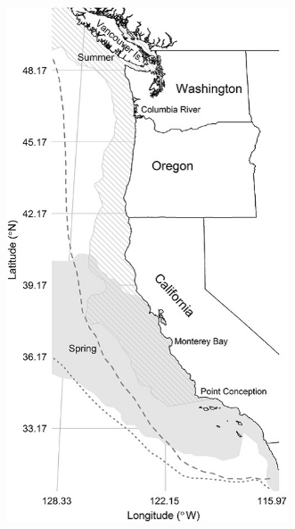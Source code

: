 \documentclass[
  letterpaper,
  oneside,
  open=any]{scrbook}
\begin{document}
\begin{figure}

\begin{minipage}{0.50\linewidth}

\begin{figure}[H]

{\centering \includegraphics[width=\textwidth,height=6in]{content/images/clipboard-1472872065.png}

}


\end{figure}%

\end{minipage}%
%
\begin{minipage}{0.50\linewidth}

\begin{figure}[H]


\end{figure}
\end{minipage}
\end{figure}
\end{document}
